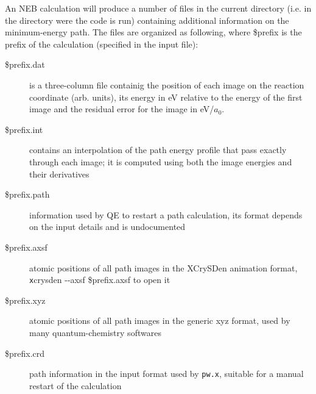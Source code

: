 \documentclass[12pt,a4paper]{article}
\def\pw.x{\texttt{pw.x}}
\begin{document}
An NEB calculation will produce a number of files in the current directory
(i.e. in the directory were the code is run) containing additional information
on the minimum-energy path. The files are organized as following, where \$prefix
is the prefix of the calculation (specified in the input file):
\begin{description}
\item[\$prefix.dat]
is a three-column file containig the position of each image on the reaction
coordinate (arb. units), its energy in eV relative to the energy of the first image
and the residual error for the image in eV/$a_0$.
\item[\$prefix.int]
contains an interpolation of the path energy profile that pass exactly through each
image; it is computed using both the image energies and their derivatives
\item[\$prefix.path]
information used by QE to restart a path calculation, its format depends on the input
details and is undocumented
\item[\$prefix.axsf]
atomic positions of all path images in the XCrySDen animation format,
{\texttt xcrysden -\--axsf \$prefix.axsf} to open it
\item[\$prefix.xyz]
atomic positions of all path images in the generic xyz format, used by
many quantum-chemistry softwares
\item[\$prefix.crd]
path information in the input format used by \pw.x, suitable for a manual
restart of the calculation
\end{description}
\end{document}
